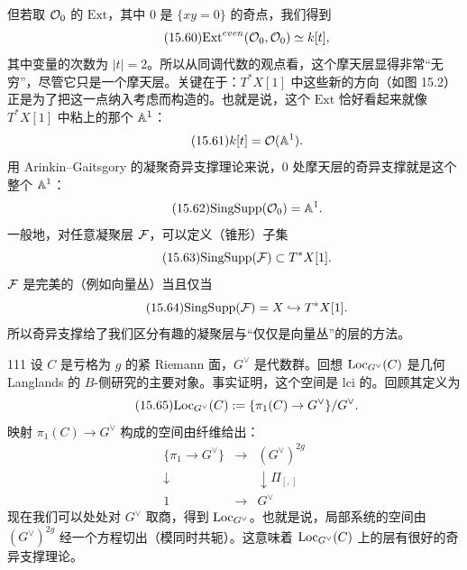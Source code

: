但若取 $\mathcal{O}_0$ 的 $\mathrm{Ext}$，其中 $0$ 是 $\{xy=0\}$ 的奇点，我们得到
\begin{equation}\tag{15.60}
\mathrm{Ext}^{even}(\mathcal{O}_0,\mathcal{O}_0)\simeq k[t],
\end{equation}
其中变量的次数为 $|t|=2$。所以从同调代数的观点看，这个摩天层显得非常“无穷”，尽管它只是一个摩天层。关键在于：$T^*X[1]$ 中这些新的方向（如图 15.2）正是为了把这一点纳入考虑而构造的。也就是说，这个 $\mathrm{Ext}$ 恰好看起来就像 $T^*X[1]$ 中粘上的那个 $\mathbb{A}^1$：
\begin{equation}\tag{15.61}
k[t]=\mathcal{O}(\mathbb{A}^1).
\end{equation}
用 Arinkin--Gaitsgory 的凝聚奇异支撑理论来说，$0$ 处摩天层的奇异支撑就是这个整个 $\mathbb{A}^1$：
\begin{equation}\tag{15.62}
\mathrm{SingSupp}(\mathcal{O}_0)=\mathbb{A}^1.
\end{equation}
一般地，对任意凝聚层 $\mathcal{F}$，可以定义（锥形）子集
\begin{equation}\tag{15.63}
\mathrm{SingSupp}(\mathcal{F})\subset T^*X[1].
\end{equation}
$\mathcal{F}$ 是完美的（例如向量丛）当且仅当
\begin{equation}\tag{15.64}
\mathrm{SingSupp}(\mathcal{F})=X\hookrightarrow T^*X[1].
\end{equation}
所以奇异支撑给了我们区分有趣的凝聚层与“仅仅是向量丛”的层的方法。

\begin{srcex}{111}
设 $C$ 是亏格为 $g$ 的紧 Riemann 面，$G^\vee$ 是代数群。回想 $\mathrm{Loc}_{G^\vee}(C)$ 是几何 Langlands 的 $B$-侧研究的主要对象。事实证明，这个空间是 lci 的。回顾其定义为
\begin{equation}\tag{15.65}
\mathrm{Loc}_{G^\vee}(C):=\{\pi_1(C)\to G^\vee\}/G^\vee.
\end{equation}
映射 $\pi_1(C)\to G^\vee$ 构成的空间由纤维给出：
\begin{equation}\tag{15.66}
\begin{array}{ccc}
\{\pi_1\to G^\vee\} & \longrightarrow & (G^\vee)^{2g}\\[2pt]
\downarrow & & \downarrow{\scriptstyle \Pi_{[,]}}\\[-2pt]
1 & \longrightarrow & G^\vee
\end{array}
\end{equation}
现在我们可以处处对 $G^\vee$ 取商，得到 $\mathrm{Loc}_{G^\vee}$。也就是说，局部系统的空间由 $(G^\vee)^{2g}$ 经一个方程切出（模同时共轭）。这意味着 $\mathrm{Loc}_{G^\vee}(C)$ 上的层有很好的奇异支撑理论。
\end{srcex}

